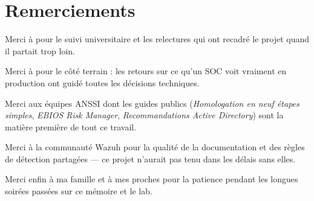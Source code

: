 \chapter*{Remerciements}

Merci à \memTutor{} pour le suivi universitaire et les relectures
qui ont recadré le projet quand il partait trop loin.

Merci à \memCompany{} pour le côté terrain : les retours sur ce
qu'un SOC voit vraiment en production ont guidé toutes les
décisions techniques.

Merci aux équipes ANSSI dont les guides publics
(\emph{Homologation en neuf étapes simples}, \emph{EBIOS Risk
Manager}, \emph{Recommandations Active Directory}) sont la
matière première de tout ce travail.

Merci à la communauté Wazuh pour la qualité de la documentation et
des règles de détection partagées --- ce projet n'aurait pas tenu
dans les délais sans elles.

Merci enfin à ma famille et à mes proches pour la patience pendant
les longues soirées passées sur ce mémoire et le lab.
